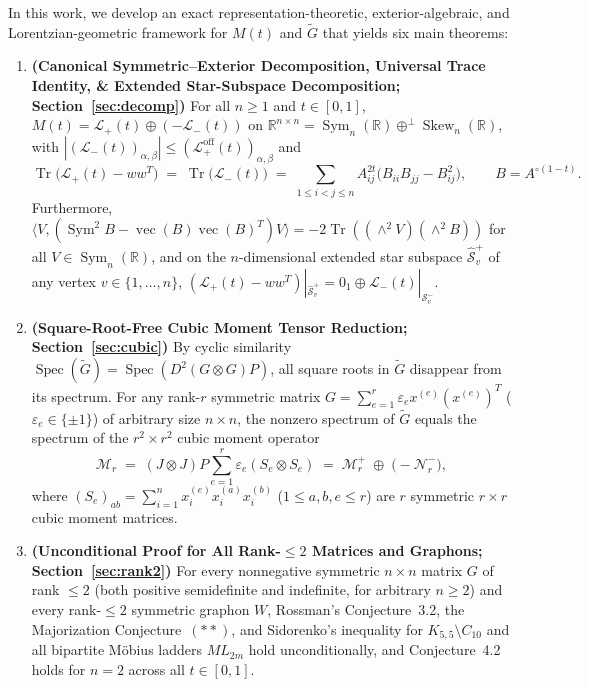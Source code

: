 \documentclass[11pt,a4paper]{article}
\theoremstyle{plain}
\theoremstyle{definition}
\theoremstyle{remark}
\DeclareMathOperator{\Tr}{Tr}
\DeclareMathOperator{\Spec}{Spec}
\DeclareMathOperator{\Sym}{Sym}
\DeclareMathOperator{\Skew}{Skew}
\DeclareMathOperator{\vecop}{vec}
\begin{document}
In this work, we develop an exact representation-theoretic, exterior-algebraic, and Lorentzian-geometric framework for $M(t)$ and $\widetilde{G}$ that yields six main theorems:
\begin{enumerate}[label=\textbf{Theorem~\arabic*.},ref=\arabic*,leftmargin=6.5em]
  \item \textbf{(Canonical Symmetric--Exterior Decomposition, Universal Trace Identity, \& Extended Star-Subspace Decomposition; Section~\ref{sec:decomp})} For all $n \ge 1$ and $t \in [0,1]$, $M(t) = \mathcal{L}_+(t) \oplus (-\mathcal{L}_-(t))$ on $\mathbb{R}^{n \times n} = \Sym_n(\mathbb{R}) \oplus^{\perp} \Skew_n(\mathbb{R})$, with $|(\mathcal{L}_-(t))_{\alpha,\beta}| \le (\mathcal{L}_+^{\mathrm{off}}(t))_{\alpha,\beta}$ and
  \[
    \Tr\big(\mathcal{L}_+(t) - w w^T\big) \;=\; \Tr\big(\mathcal{L}_-(t)\big) \;=\; \sum_{1 \le i < j \le n} A_{ij}^{2t}\big(B_{ii}B_{jj} - B_{ij}^2\big), \qquad B = A^{\circ(1-t)}.
  \]
  Furthermore, $\langle V, (\Sym^2 B - \vecop(B)\vecop(B)^T)V \rangle = -2\Tr((\wedge^2 V)(\wedge^2 B))$ for all $V \in \Sym_n(\mathbb{R})$, and on the $n$-dimensional extended star subspace $\widehat{\mathcal{S}}_v^+$ of any vertex $v \in \{1,\dots,n\}$, $(\mathcal{L}_+(t) - w w^T)|_{\widehat{\mathcal{S}}_v^+} = 0_1 \oplus \mathcal{L}_-(t)|_{\mathcal{S}_v^-}$.
  \item \textbf{(Square-Root-Free Cubic Moment Tensor Reduction; Section~\ref{sec:cubic})} By cyclic similarity $\Spec(\widetilde{G}) = \Spec(D^2(G \otimes G)P)$, all square roots in $\widetilde{G}$ disappear from its spectrum. For any rank-$r$ symmetric matrix $G = \sum_{e=1}^r \varepsilon_e x^{(e)}(x^{(e)})^T$ ($\varepsilon_e \in \{\pm 1\}$) of arbitrary size $n \times n$, the nonzero spectrum of $\widetilde{G}$ equals the spectrum of the $r^2 \times r^2$ cubic moment operator
  \[
    \mathcal{M}_r \;=\; (J \otimes J)P \sum_{e=1}^r \varepsilon_e (S_e \otimes S_e) \;=\; \mathcal{M}_r^+ \;\oplus\; \big(-\mathcal{N}_r^-\big),
  \]
  where $(S_e)_{ab} = \sum_{i=1}^n x_i^{(e)} x_i^{(a)} x_i^{(b)}$ ($1 \le a,b,e \le r$) are $r$ symmetric $r \times r$ cubic moment matrices.
  \item \textbf{(Unconditional Proof for All Rank-$\le 2$ Matrices and Graphons; Section~\ref{sec:rank2})} For every nonnegative symmetric $n \times n$ matrix $G$ of rank $\le 2$ (both positive semidefinite and indefinite, for arbitrary $n \ge 2$) and every rank-$\le 2$ symmetric graphon $W$, Rossman's Conjecture~3.2, the Majorization Conjecture~$(**)$, and Sidorenko's inequality for $K_{5,5} \setminus C_{10}$ and all bipartite M\"obius ladders $ML_{2m}$ hold unconditionally, and Conjecture~4.2 holds for $n = 2$ across all $t \in [0,1]$.

\end{enumerate}
\end{document}
